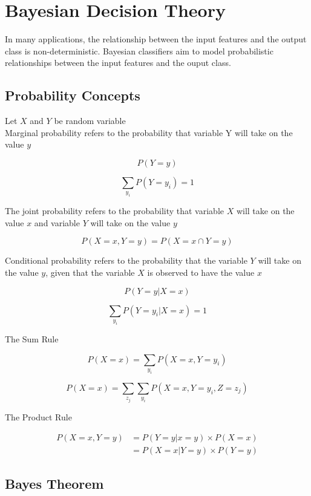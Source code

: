 \chapter{Bayesian Decision Theory}

\begin{multicols}{2}
\noindent In many applications, the relationship between the input features and the output class is non-deterministic. Bayesian classifiers aim to model probabilistic relationships between the input features and the ouput class. 

\section{Probability Concepts}

\noindent Let $X$ and $Y$ be random variable \\

\noindent Marginal probability refers to the probability that variable Y will take on the value $y$

$$P(Y = y)$$

$$\sum_{y_{i}} P(Y = y_{i}) = 1$$

\noindent The joint probability refers to the probability that variable $X$ will take on the value $x$ and variable $Y$ will take on the value $y$

$$P(X=x, Y=y) = P(X=x \cap Y=y)$$

\noindent Conditional probability refers to the probability that the variable $Y$ will take on the value $y$, given that the variable $X$ is observed to have the value $x$

$$P( Y=y | X=x )$$

$$\sum_{y_{i}} P(Y=y_{i} | X=x) = 1$$

\noindent The Sum Rule

$$P(X=x) = \sum_{y_{i}} P(X=x , Y=y_{i})$$

$$P(X=x) = \sum_{z_{j}} \sum_{y_{i}} P(X=x , Y=y_{i}, Z=z_{j})$$

\noindent The Product Rule

\begin{equation*}
\begin{split}
    P(X=x,Y=y) &= P(Y=y|x=y) \times P(X=x)\\
    &= P(X=x|Y=y) \times P(Y=y)
\end{split}
\end{equation*}

\section{Bayes Theorem}


\end{multicols}
